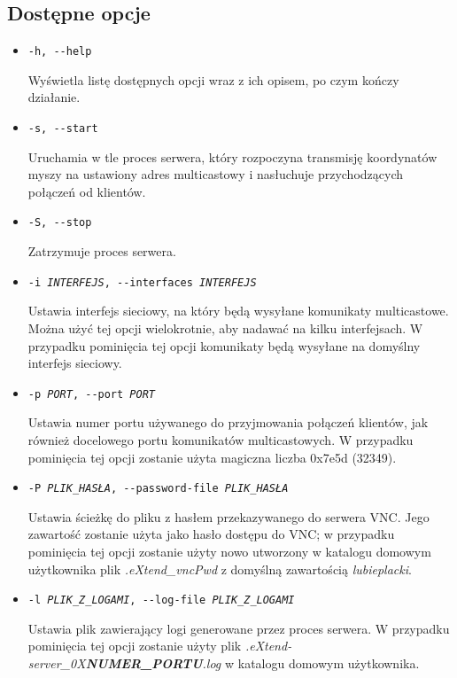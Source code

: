   \subsection{Dostępne opcje}

  \begin{itemize}
    \item \texttt{-h, -{}-help}

      Wyświetla listę dostępnych opcji wraz z ich opisem, po czym kończy działanie.

    \item \texttt{-s, -{}-start}

      Uruchamia w tle proces serwera, który rozpoczyna transmisję koordynatów myszy na ustawiony adres multicastowy i nasłuchuje przychodzących połączeń od klientów.

    \item \texttt{-S, -{}-stop}

      Zatrzymuje proces serwera.

    \item \texttt{-i \emph{INTERFEJS}, -{}-interfaces \emph{INTERFEJS}}

      Ustawia interfejs sieciowy, na który będą wysyłane komunikaty multicastowe. Można użyć tej opcji wielokrotnie, aby nadawać na kilku interfejsach. W przypadku pominięcia tej opcji komunikaty będą wysyłane na domyślny interfejs sieciowy.

    \item \texttt{-p \emph{PORT}, -{}-port \emph{PORT}}

      Ustawia numer portu używanego do przyjmowania połączeń klientów, jak również docelowego portu komunikatów multicastowych. W przypadku pominięcia tej opcji zostanie użyta magiczna liczba 0x7e5d (32349).

    \item \texttt{-P \emph{PLIK\_HASŁA}, -{}-password-file \emph{PLIK\_HASŁA}}

      Ustawia ścieżkę do pliku z hasłem przekazywanego do serwera VNC. Jego zawartość zostanie użyta jako hasło dostępu do VNC; w przypadku pominięcia tej opcji zostanie użyty nowo utworzony w katalogu domowym użytkownika plik \emph{.eXtend\_vncPwd} z domyślną zawartością \emph{lubieplacki}.

    \item \texttt{-l \emph{PLIK\_Z\_LOGAMI}, -{}-log-file \emph{PLIK\_Z\_LOGAMI}}

      Ustawia plik zawierający logi generowane przez proces serwera. W przypadku pominięcia tej opcji zostanie użyty plik \emph{.eXtend-server\_0X\textbf{NUMER\_PORTU}.log} w katalogu domowym użytkownika.


\end{itemize}
